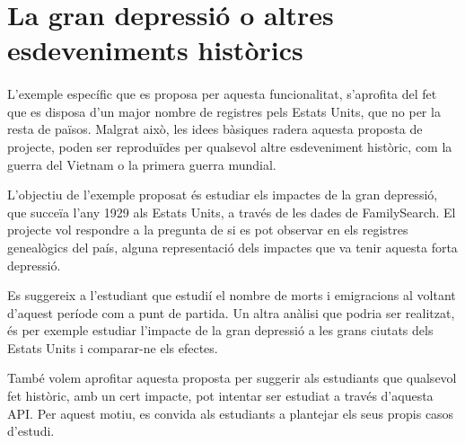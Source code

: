 \section{La gran depressió o altres esdeveniments històrics}

    \paragraph{}
    L'exemple específic que es proposa per aquesta funcionalitat, s'aprofita del fet que es disposa d'un major nombre de registres pels Estats Units, que no per la resta de països. Malgrat això, les idees bàsiques radera aquesta proposta de projecte, poden ser reproduïdes per qualsevol altre esdeveniment històric, com la guerra del Vietnam o la primera guerra mundial.

    L'objectiu de l'exemple proposat és estudiar els impactes de la gran depressió, que succeïa l'any 1929 als Estats Units, a través de les dades de FamilySearch. El projecte vol respondre a la pregunta de si es pot observar en els registres genealògics del país, alguna representació dels impactes que va tenir aquesta forta depressió.

    Es suggereix a l'estudiant que estudií el nombre de morts i emigracions al voltant d'aquest període com a punt de partida. Un altra anàlisi que podria ser realitzat, és per exemple estudiar l’impacte de la gran depressió a les grans ciutats dels Estats Units i comparar-ne els efectes.

    També volem aprofitar aquesta proposta per suggerir als estudiants que qualsevol fet històric, amb un cert impacte, pot intentar ser estudiat a través d'aquesta API. Per aquest motiu, es convida als estudiants a plantejar els seus propis casos d'estudi.
